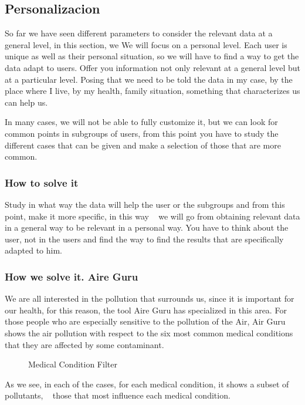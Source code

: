 \subsection{Personalizacion}
So far we have seen different parameters to consider the relevant data at a general level, in this section, we
We will focus on a personal level.
Each user is unique as well as their personal situation, so we will have to find a way to get the data
adapt to users. Offer you information not only relevant at a general level but at a particular level.
Posing that we need to be told the data in my case, by the place where I live, by
my health, family situation, something that characterizes us can help us.

In many cases, we will not be able to fully customize it, but we can look for common points in subgroups of
users, from this point you have to study the different cases that can be given and make a selection of those that are
more common.


\subsubsection{How to solve it} 

Study in what way the data will help the user or the subgroups and from this point, make it more specific, in this way
  we will go from obtaining relevant data in a general way to be relevant in a personal way. You have to think about the
  user, not in the users and find the way to find the results that are specifically adapted to him.
 \subsubsection{How we solve it. Aire Guru} 
 We are all interested in the pollution that surrounds us, since it is important for our health, for this reason, the tool
 Aire Guru has specialized in this area. For those people who are especially sensitive to the pollution of the
 Air, Air Guru shows the air pollution with respect to the six most common medical conditions that
 they are affected by some contaminant.
 

\begin{figure}[ht]
    \centering
    \hfill
    \hfill
  
  \caption{Medical Condition Filter}
    \end{figure}
    As we see, in each of the cases, for each medical condition, it shows a subset of pollutants,
      those that most influence each medical condition.
    
